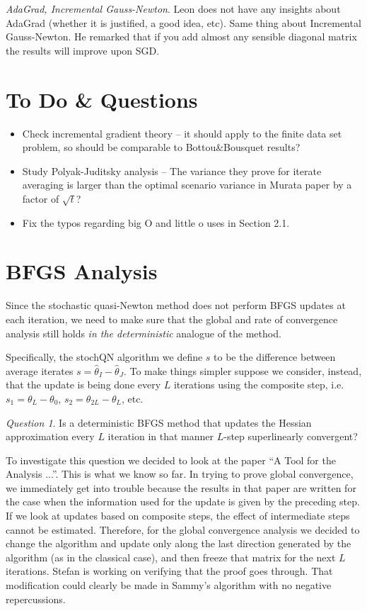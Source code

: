 \documentclass[12pt]{article}
\begin{document}
\medskip\noindent\emph{AdaGrad, Incremental Gauss-Newton}. Leon does not have any insights about AdaGrad (whether it is justified, a good idea, etc). Same thing about Incremental Gauss-Newton. He remarked that if you add almost any sensible diagonal matrix the results will improve upon SGD.


\newpage%
\section{To Do \& Questions}
\begin{itemize}
 \item Check incremental gradient theory -- it should apply to the finite data set problem, so should be comparable to Bottou\&Bousquet results?  
 \item Study Polyak-Juditsky analysis -- The variance they prove for iterate averaging is larger than the optimal scenario variance in Murata paper by a factor of $\sqrt{t}$?
 \item Fix the typos regarding big O and little o uses in Section 2.1. 
\end{itemize}

\newpage%
\section{BFGS Analysis}

Since the stochastic quasi-Newton method does not perform BFGS updates at each iteration, we need to make sure that the global and rate of convergence analysis still holds \emph{in the deterministic} analogue of the method.

Specifically, the stochQN algorithm we define $s$ to be the difference between average iterates $s= \hat \theta_I -\hat \theta_J$. To make things simpler suppose we consider, instead, that the update is being done every $L$ iterations using the composite step, i.e. $s_1= \theta_L - \theta_0$, $s_2= \theta_{2L} -\theta_L$, etc.

\medskip\noindent\emph{Question 1}. Is a deterministic BFGS method that updates the Hessian approximation every $L$ iteration in that manner $L$-step superlinearly convergent? 

\medskip To investigate this question we decided to look at the paper ``A Tool for the Analysis ...''. This is what we know so far. In trying to prove global convergence, we immediately get into trouble because the results in that paper are written for the case when the information used for the update is given by the preceding step. If we look at updates based on composite steps, the effect of intermediate steps cannot be estimated. Therefore, for the global convergence analysis we decided to change the algorithm and update only along the last direction generated by the algorithm (as in the classical case), and then freeze that matrix for the next $L$ iterations. Stefan is working on verifying that the proof goes through. That modification could clearly be made in Sammy's algorithm with no negative repercussions.
\end{document}

